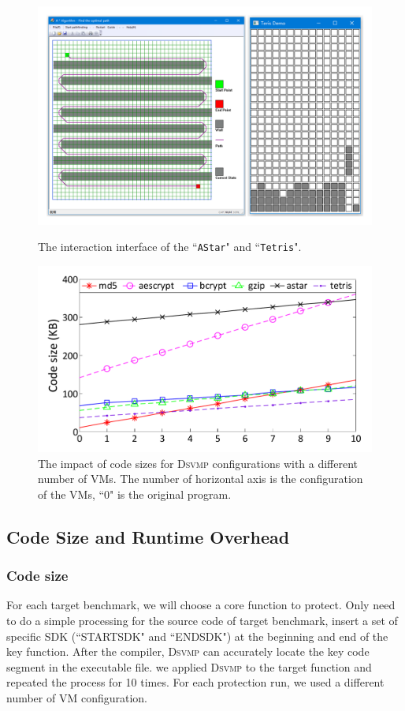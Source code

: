 \documentclass[preprint,12pt,3p]{elsarticle}
\newcommand{\DSVMP}{\textsc{Dsvmp}\xspace}
\begin{document}
\begin{figure}[t]
\centering
\begin{minipage}[t]{0.49\linewidth}
\centering
\includegraphics[width=.9\textwidth]{figure/case2.pdf}
\caption{The interaction interface of the ``\texttt{AStar}" and ``\texttt{Tetris}". }\label{fig:Fig.case}
\end{minipage}
\hspace{0.005\textwidth}
\begin{minipage}[t]{0.49\linewidth}
\centering
\includegraphics[width=.9\textwidth]{figure/codesize.pdf}
\caption{The impact of code sizes for \DSVMP configurations with a different number of VMs. The number of horizontal axis is the configuration of the VMs, ``0" is the original program.}\label{fig:Fig.size}
\end{minipage}
\end{figure}

\subsection{Code Size and Runtime Overhead}\label{sec:benchmarktest}
\subsubsection{Code size}
For each target benchmark, we will choose a core function to protect.
Only need to do a simple processing for the source code of target benchmark,
insert a set of specific SDK (``STARTSDK" and ``ENDSDK") at the beginning and end of the key function.
After the compiler, \DSVMP can accurately locate the key code segment in the executable file.
we applied \DSVMP to the target function and repeated the process for 10 times.
For each protection run, we used a different number of VM configuration.
\end{document}
